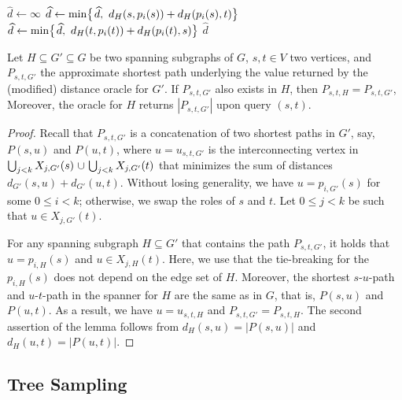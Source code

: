 \documentclass{article}\usepackage[a4paper,margin=20mm]{geometry}
\newcommand*{\nwspace}{\hspace*{.1em}}
\renewcommand{\le}{\leqslant}
\begin{document}
\setcounter{AlgoLine}{0}
\begin{algorithm}[H]
    $\widehat{d} \gets \infty$\; 
    {
          {$\widehat{d} \gets \min\!\big\{\nwspace \widehat{d}, \
            d_H(s,p_{i}(s)) + d_H(p_{i}(s),t) \big\}$}
          {$\widehat{d} \gets \min\!\big\{ \nwspace \widehat{d}, \
            d_H(t,p_{i}(t))+d_H(p_{i}(t),s) \big\}$}
    }
    \Return $\widehat{d}$\;
    \caption{Modified query algorithm of the distance oracle for the pair $(s,t)$.}
    \label{alg:query_new}
\end{algorithm}

 \begin{lemma}
\label{lem:new_query_inheritance}
  Let $H \subseteq G' \subseteq G$ be two spanning subgraphs of $G$, $s,t \in V$ two vertices,
  and $P_{s,t,G'}$ the approximate shortest path underlying the value returned by the
  (modified) distance oracle for $G'$.
  If $P_{s,t,G'}$ also exists in $H$, then $P_{s,t,H} = P_{s,t,G'}$,
  Moreover, the oracle for $H$ returns $|P_{s,t,G'}|$ upon query $(s,t)$.
\end{lemma}

\begin{proof}
  Recall that $P_{s,t,G'}$ is a concatenation of two shortest paths in $G'$,
  say, $P(s,u)$ and $P(u,t)$, where $u = u_{s,t,G'}$ is the interconnecting
  vertex in $\bigcup_{j<k}X_{j,G'}(s) \nwspace \cup \nwspace \bigcup_{j<k}X_{j,G'}(t)$  
  that minimizes the sum of distances $d_{G'}(s,u)+d_{G'}(u,t)$.
  Without losing generality, we have $u = p_{i,G'}(s)$ for some $0 \le i < k$;
  otherwise, we swap the roles of $s$ and $t$.
  Let $0 \le j < k$ be such that $u \in X_{j,G'}(t)$.
  
  For any spanning subgraph $H \subseteq G'$ that contains the path $P_{s,t,G'}$,
  it holds that $u=p_{i,H}(s)$ and $u \in X_{j,H}(t)$.
  Here, we use that the tie-breaking for the $p_{i,H}(s)$ does not depend on the edge set of $H$.
  Moreover, the shortest $s$-$u$-path and $u$-$t$-path in the spanner for $H$
  are the same as in $G$, that is, $P(s,u)$ and $P(u,t)$.
  As a result, we have $u = u_{s,t,H}$ and $P_{s,t,G'} = P_{s,t,H}$.
  The second assertion of the lemma follows from $d_H(s,u) = |P(s,u)|$ and $d_H(u,t) = |P(u,t)|$.
\end{proof}


\subsection{Tree Sampling}
\label{subsec:short_paths_tree_sampling}
\end{document}
